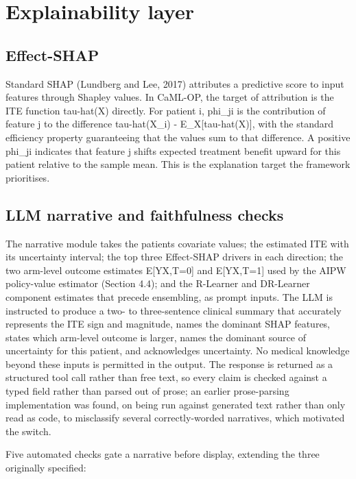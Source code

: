 \section{Explainability layer}\label{explainability-layer}

\subsection{Effect-SHAP}\label{effect-shap}

Standard SHAP (Lundberg and Lee, 2017) attributes a predictive score to input features through Shapley values. In CaML-OP, the target of attribution is the ITE function tau-hat(X) directly. For patient i, phi\_ji is the contribution of feature j to the difference tau-hat(X\_i) - E\_X{[}tau-hat(X){]}, with the standard efficiency property guaranteeing that the values sum to that difference. A positive phi\_ji indicates that feature j shifts expected treatment benefit upward for this patient relative to the sample mean. This is the explanation target the framework prioritises.

\subsection{LLM narrative and faithfulness checks}\label{llm-narrative-and-faithfulness-checks}

The narrative module takes the patient\textquotesingle s covariate values; the estimated ITE with its uncertainty interval; the top three Effect-SHAP drivers in each direction; the two arm-level outcome estimates E{[}Y\textbar X,T=0{]} and E{[}Y\textbar X,T=1{]} used by the AIPW policy-value estimator (Section 4.4); and the R-Learner and DR-Learner component estimates that precede ensembling, as prompt inputs. The LLM is instructed to produce a two- to three-sentence clinical summary that accurately represents the ITE sign and magnitude, names the dominant SHAP features, states which arm-level outcome is larger, names the dominant source of uncertainty for this patient, and acknowledges uncertainty. No medical knowledge beyond these inputs is permitted in the output. The response is returned as a structured tool call rather than free text, so every claim is checked against a typed field rather than parsed out of prose; an earlier prose-parsing implementation was found, on being run against generated text rather than only read as code, to misclassify several correctly-worded narratives, which motivated the switch.

Five automated checks gate a narrative before display, extending the three originally specified:

